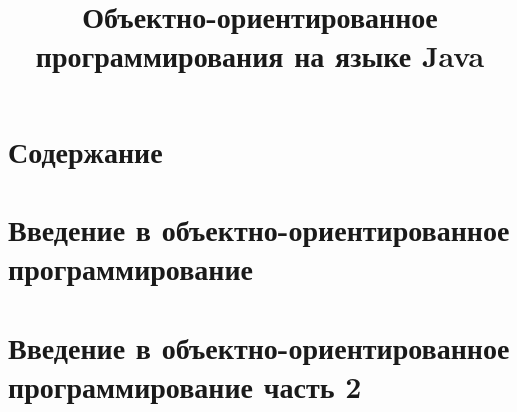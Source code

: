 \documentclass[hyperref={unicode}]{beamer}
\title{Объектно-ориентированное программирования на языке Java}
\begin{document}
\frame{\titlepage}

\section*{Содержание}
\frame{\tableofcontents}

\section{Введение в объектно-ориентированное программирование}


\section{Введение в объектно-ориентированное программирование часть 2}

\end{document}
